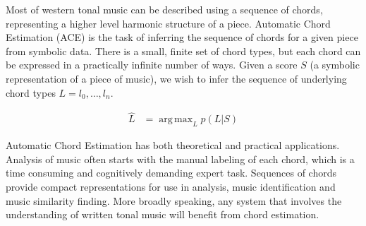 \documentclass[12pt,a4paper,twoside,openright]{report}
\DeclareMathOperator*{\argmax}{arg\,max}
\theoremstyle{definition}
\begin{document}
Most of western tonal music can be described using a sequence of chords, representing a higher level harmonic structure of a piece. Automatic Chord Estimation (ACE) is the task of inferring the sequence of chords for a given piece from symbolic data. There is a small, finite set of chord types, but each chord can be expressed in a practically infinite number of ways. Given a score $S$ (a symbolic representation of a piece of music), we wish to infer the sequence of underlying chord types $L = l_0, \dots, l_n$. 

\begin{equation}
  \begin{aligned}
    \hat L &= \argmax_L p(L|S) 
  \end{aligned}
\end{equation} 
%


Automatic Chord Estimation has both theoretical and practical applications. 
Analysis of music often starts with the manual labeling of each chord, which is a time consuming and cognitively demanding expert task. 
Sequences of chords provide compact representations for use in analysis, music identification and music similarity finding.
More broadly speaking, any system that involves the understanding of written tonal music will benefit from chord estimation. 
\end{document}
